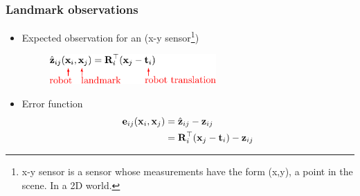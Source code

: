     \begin{frame}
     \frametitle{Landmark observations}
    
    \vspace{4em}
    \begin{itemize}
    \item Expected observation for an (x-y sensor\footnote{x-y sensor is a sensor whose measurements have the form (x,y), a point in the scene. In a 2D world.})
    \begin{figure}[!h]
    \includegraphics[width=0.6\textwidth]{images/pose_landmark_graph_expected_observation.pdf}
    \end{figure}
    \item Error function
    \begin{align*}
    \boldsymbol{\mathbf{e}}_{ij}(\boldsymbol{\mathbf{x}}_{i}, \boldsymbol{\mathbf{x}}_{j}) &= \hat{\boldsymbol{\mathbf{z}}}_{ij} - \boldsymbol{\mathbf{z}}_{ij}\\
    &= \boldsymbol{\mathbf{R}}_{i}^{\top}(\boldsymbol{\mathbf{x}}_{j}-\boldsymbol{\mathbf{t}}_{i}) - \boldsymbol{\mathbf{z}}_{ij}
     \end{align*}
     \end{itemize}
    
    \end{frame}
    
